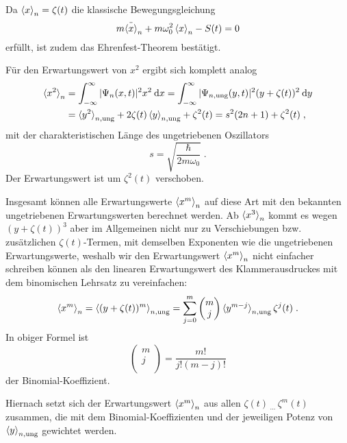     Da $\braket{x}_n=\zeta(t)$ die klassische Bewegungsgleichung
    \begin{equation}
      m\ddot{\braket{x}}_n + m\omega_0^2\braket{x}_n - S(t) = 0
    \end{equation}
    erfüllt, ist zudem das Ehrenfest-Theorem bestätigt.

    Für den Erwartungswert von $x^2$ ergibt sich komplett analog
    \begin{align}
      \braket{x^2}_n &= \int_{-\infty}^{\infty} |\Psi_n(x,t)|^2 x^2 \: \text dx
      = \int_{-\infty}^{\infty} |\Psi_{n,\text{ung}}(y,t)|^2 (y+\zeta(t))^2 \: \text dy \notag \\
      &= \braket{y^2}_{n,\text{ung}} + 2\zeta(t)\braket{y}_{n,\text{ung}} + \zeta^2(t)
      = s^2(2n+1) + \zeta^2(t) \; ,
      \label{erwartungswert_x^2_einzelner}
    \end{align}
    mit der charakteristischen Länge des ungetriebenen Oszillators
    \begin{equation}
      s = \sqrt{\frac{\hbar}{2m\omega_0}} \; .
      \label{charak_laenge}
    \end{equation}
    Der Erwartungswert ist um $\zeta^2(t)$ verschoben.

    Insgesamt können alle Erwartungswerte $\braket{x^m}_n$ auf diese Art mit den bekannten ungetriebenen Erwartungswerten berechnet werden.
    Ab $\braket{x^3}_n$ kommt es wegen $(y+\zeta(t))^3$ aber im Allgemeinen nicht nur zu Verschiebungen bzw. zusätzlichen $\zeta(t)$-Termen, mit demselben Exponenten wie die ungetriebenen Erwartungswerte, weshalb wir den Erwartungswert $\braket{x^m}_n$ nicht einfacher schreiben können als den linearen Erwartungswert des Klammerausdruckes mit dem binomischen Lehrsatz zu vereinfachen:
    \begin{equation}
      \braket{x^m}_n = \braket{(y+\zeta(t))^m}_{n,\text{ung}} = \sum_{j=0}^m \begin{pmatrix} m \\ j \\ \end{pmatrix} \braket{y^{m-j}}_{n,\text{ung}}\zeta^j(t) \; .
      \label{erwartungswert_x^m_einzelner}
    \end{equation}
    In obiger Formel ist
    \begin{equation}
      \begin{pmatrix} m \\ j \\ \end{pmatrix} = \frac{m!}{j!(m-j)!}
    \end{equation}
    der Binomial-Koeffizient.
\iffalse
\begin{equation}
  \braket{x^m}_n = \braket{(y+\zeta(t))^m}_{n,\text{ung}} = \sum_{j=0}^m \frac{m!}{j!(m-j)!} \braket{y^{m-j}}_{n,\text{ung}}\zeta^j(t) \; .
  \label{erwartungswert_x^m_einzelner}
\end{equation}
\fi
    Hiernach setzt sich der Erwartungswert $\braket{x^m}_n$ aus allen $\zeta(t)\,_{...}\,\zeta^m(t)$ zusammen, die mit dem Binomial-Koeffizienten und der jeweiligen Potenz von $\braket{y}_{n,\text{ung}}$ gewichtet werden.


